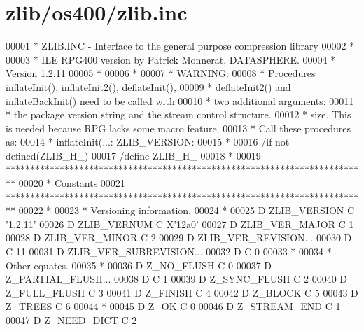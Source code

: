 \hypertarget{zlib_2os400_2zlib_8inc_source}{}\section{zlib/os400/zlib.inc}
\label{zlib_2os400_2zlib_8inc_source}

\begin{DoxyCode}
00001       *  ZLIB.INC - Interface to the general purpose compression library
00002       *
00003       *  ILE RPG400 version by Patrick Monnerat, DATASPHERE.
00004       *  Version 1.2.11
00005       *
00006       *
00007       *  WARNING:
00008       *     Procedures inflateInit(), inflateInit2(), deflateInit(),
00009       *         deflateInit2() and inflateBackInit() need to be called with
00010       *         two additional arguments:
00011       *         the package version \textcolor{keywordtype}{string} and the stream control structure.
00012       *         size. This is needed because RPG lacks some macro feature.
00013       *         Call these procedures as:
00014       *             inflateInit(...: ZLIB\_VERSION: %
00015       *
00016       /if not defined(ZLIB\_H\_)
00017       /define ZLIB\_H\_
00018       *
00019       **************************************************************************
00020       *                               Constants
00021       **************************************************************************
00022       *
00023       *  Versioning information.
00024       *
00025      D ZLIB\_VERSION    C                   '1.2.11'
00026      D ZLIB\_VERNUM     C                   X'12a0'
00027      D ZLIB\_VER\_MAJOR  C                   1
00028      D ZLIB\_VER\_MINOR  C                   2
00029      D ZLIB\_VER\_REVISION...
00030      D                 C                   11
00031      D ZLIB\_VER\_SUBREVISION...
00032      D                 C                   0
00033       *
00034       *  Other equates.
00035       *
00036      D Z\_NO\_FLUSH      C                   0
00037      D Z\_PARTIAL\_FLUSH...
00038      D                 C                   1
00039      D Z\_SYNC\_FLUSH    C                   2
00040      D Z\_FULL\_FLUSH    C                   3
00041      D Z\_FINISH        C                   4
00042      D Z\_BLOCK         C                   5
00043      D Z\_TREES         C                   6
00044       *
00045      D Z\_OK            C                   0
00046      D Z\_STREAM\_END    C                   1
00047      D Z\_NEED\_DICT     C                   2

\end{DoxyCode}
